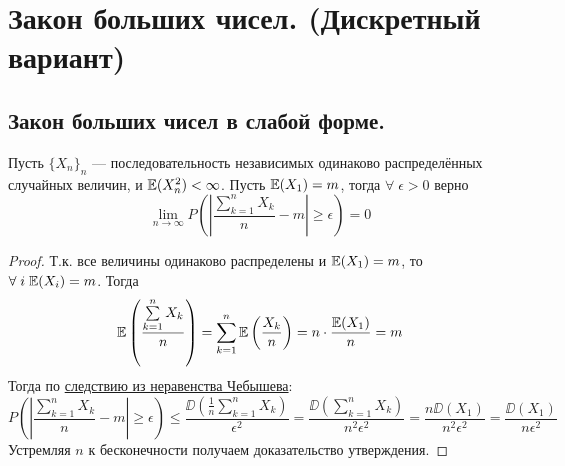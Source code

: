 \section{Закон больших чисел. (Дискретный вариант)}

\subsection{Закон больших чисел в слабой форме.}
\begin{lemma}
    Пусть $\{X_n\}_n$ --- последовательность независимых одинаково распределённых случайных величин, и $\mathbb{E}(X_n^2) < \infty$.
    Пусть $\mathbb{E}(X_1) = m$, тогда $\forall\;\epsilon > 0$ верно
    \[
        \lim\limits_{n \to \infty} P\left( \left| \frac{\sum\limits_{k = 1}^n X_k}{n} - m \right| \geq \epsilon \right) = 0
    \]
\end{lemma}
\begin{proof}
    Т.к. все величины одинаково распределены и $\mathbb{E}(X_1) = m$, то $\forall\; i\; \mathbb{E}(X_i) = m$. Тогда
    \[
        \mathbb{E}\left( \frac{\sum\limits_{k = 1}^n X_k}{n} \right) = \sum\limits_{k = 1}^n \mathbb{E}\left( \frac{X_k}{n} \right) =
        n \cdot \frac{\mathbb{E}(X_1)}{n} = m
    \]
    Тогда по \hyperref[ChebyshevCorollary]{следствию из неравенства Чебышева}:
    \[
        P\left( \left| \frac{\sum\limits_{k = 1}^n X_k}{n} - m \right| \geq \epsilon \right)
        \leq \frac{\DD\left(\frac{1}{n}\sum\limits_{k = 1}^n X_k\right)}{\epsilon^2} =
        \frac{\DD\left(\sum\limits_{k = 1}^n X_k\right)}{n^2\epsilon^2} =
        \frac{n\DD(X_1)}{n^2\epsilon^2} = \frac{\DD(X_1)}{n\epsilon^2}
    \]
    Устремляя $n$ к бесконечности получаем доказательство утверждения.
\end{proof}
\begin{comment}
    Пусть $X_k$ --- независимые бернулиевские случайные величины с вероятностью успеха $p$. Тогда величина
    $\frac{\sum\limits_{k = 1}^n X_k}{n}$ --- частота успешного исхода эксперимента при проведении $n$ независимых
    испытаний. Известно, что $\EE(X_k) = p$, тогда $\DD(X_k) = \EE(X_k^2) - \EE(X_k)^2 = p^2 - p = pq$, где $q = (1 - p)$.
    Тогда
    \[
        P\left( \left| \frac{\sum\limits_{k = 1}^n X_k}{n} - p \right| \geq \epsilon \right)
        \leq \frac{pq}{n\epsilon^2} \xrightarrow[n \to \infty]{} 0
    \]
    Т.е. при проведении большого числа испытаний, частота успешного результата эсперимента стремится к $p$.

    Можно разобрать смысл этого утверждения на примере: пусть эксперимент у нас состоит в подкидывании монеты, успехом
    мы считаем выпадение орла. Очевидно, что в одном независимом испытании орёл выпадает с вероятностью $\frac{1}{2}$.
    При этом в жизни подбрасывая монету $5, 10$ и даже $100$ раз мы можем ни разу не получить орла. Но данное утверждение
    говорит нам о том, что при проведении огромного числа испытаний, вероятность выпадения орла в среднем во всех испытаниях
    будет примерно $\frac{1}{2}$.
\end{comment}

